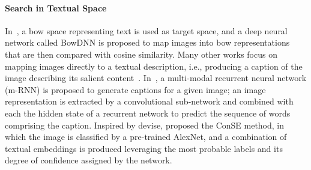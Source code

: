 \paragraph{Search in Textual Space}
In~\cite{bai2014bag}, a \acrfull{bow} space representing text is used as target space, and a deep neural network called BowDNN is proposed to map images into \gls{bow} representations that are then compared with cosine similarity.
Many other works focus on mapping images directly to a textual description, i.e., producing a caption of the image describing its salient content~\cite{vinyals2015show,karpathy2015deep,fang2015captions}.
In~\cite{mao2014deep}, a multi-modal recurrent neural network (m-RNN) is proposed to generate captions for a given image;
an image representation is extracted by a convolutional sub-network and combined with each the hidden state of a recurrent network to predict the sequence of words comprising the caption.
Inspired by \gls{devise}, \citet{norouzi2013zero} proposed the ConSE method, in which the image is classified by a pre-trained AlexNet, and a combination of textual embeddings is produced leveraging the most probable labels and its degree of confidence assigned by the network.

